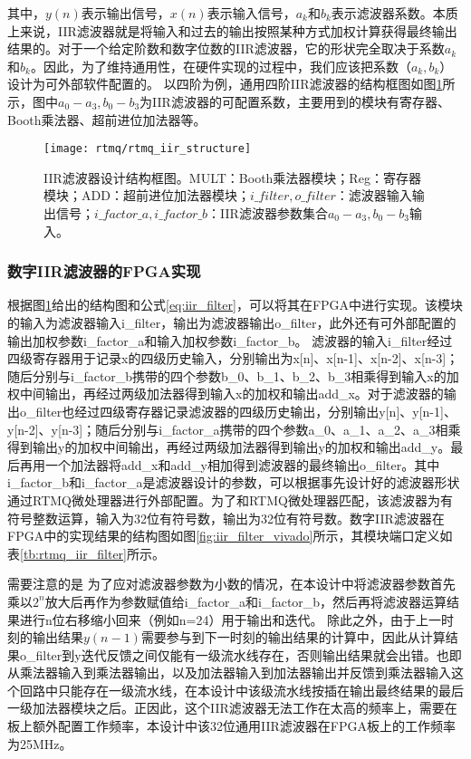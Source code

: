 其中，$y(n)$表示输出信号，$x(n)$表示输入信号，$a_k$和$b_k$表示滤波器系数。本质上来说，IIR滤波器就是将输入和过去的输出按照某种方式加权计算获得最终输出结果的。对于一个给定阶数和数字位数的IIR滤波器，它的形状完全取决于系数$a_k$和$b_k$。因此，为了维持通用性，在硬件实现的过程中，我们应该把系数（$a_k, b_k$）设计为可外部软件配置的。
以四阶为例，通用四阶IIR滤波器的结构框图如图\ref{fig:rtmq_iir_structure}所示，图中$a_0-a_3, b_0-b_3$为IIR滤波器的可配置系数，主要用到的模块有寄存器、Booth乘法器、超前进位加法器等。
\begin{figure}
    \centering
    \caption[IIR滤波器设计结构框图]{IIR滤波器设计结构框图。MULT：Booth乘法器模块；Reg：寄存器模块；ADD：超前进位加法器模块；$i\_filter, o\_filter$：滤波器输入输出信号；$i\_factor\_a,i\_factor\_b$：IIR滤波器参数集合$a_0-a_3, b_0-b_3$输入。\label{fig:rtmq_iir_structure}}
    \texttt{[image: rtmq/rtmq\_iir\_structure]}
\end{figure}


\subsubsection[高速通用数字IIR滤波器的FPGA实现]{数字IIR滤波器的FPGA实现}

根据图\ref{fig:rtmq_iir_structure}给出的结构图和公式\eqref{eq:iir_filter}，可以将其在FPGA中进行实现。该模块的输入为滤波器输入i\_filter，输出为滤波器输出o\_filter，此外还有可外部配置的输出加权参数i\_factor\_a和输入加权参数i\_factor\_b。
滤波器的输入i\_filter经过四级寄存器用于记录x的四级历史输入，分别输出为x[n]、x[n-1]、x[n-2]、x[n-3]；随后分别与i\_factor\_b携带的四个参数b\_0、b\_1、b\_2、b\_3相乘得到输入x的加权中间输出，再经过两级加法器得到输入x的加权和输出add\_x。对于滤波器的输出o\_filter也经过四级寄存器记录滤波器的四级历史输出，分别输出y[n]、y[n-1]、y[n-2]、y[n-3]；随后分别与i\_factor\_a携带的四个参数a\_0、a\_1、a\_2、a\_3相乘得到输出y的加权中间输出，再经过两级加法器得到输出y的加权和输出add\_y。最后再用一个加法器将add\_x和add\_y相加得到滤波器的最终输出o\_filter。其中i\_factor\_b和i\_factor\_a是滤波器设计的参数，可以根据事先设计好的滤波器形状通过RTMQ微处理器进行外部配置。为了和RTMQ微处理器匹配，该滤波器为有符号整数运算，输入为32位有符号数，输出为32位有符号数。数字IIR滤波器在FPGA中的实现结果的结构图如图\ref{fig:iir_filter_vivado}所示，其模块端口定义如表\ref{tb:rtmq_iir_filter}所示。

需要注意的是
为了应对滤波器参数为小数的情况，在本设计中将滤波器参数首先乘以$2^{n}$放大后再作为参数赋值给i\_factor\_a和i\_factor\_b，然后再将滤波器运算结果进行n位右移缩小回来（例如n=24）用于输出和迭代。
除此之外，由于上一时刻的输出结果$y(n-1)$需要参与到下一时刻的输出结果的计算中，因此从计算结果o\_filter到y迭代反馈之间仅能有一级流水线存在，否则输出结果就会出错。也即从乘法器输入到乘法器输出，以及加法器输入到加法器输出并反馈到乘法器输入这个回路中只能存在一级流水线，在本设计中该级流水线按插在输出最终结果的最后一级加法器模块之后。正因此，这个IIR滤波器无法工作在太高的频率上，需要在板上额外配置工作频率，本设计中该32位通用IIR滤波器在FPGA板上的工作频率为25MHz。


